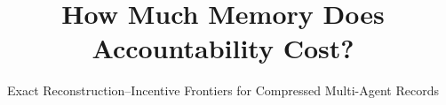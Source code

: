 \documentclass[sigconf, nonacm]{acmart}
\begin{document}
\title{How Much Memory Does Accountability Cost?}
\subtitle{Exact Reconstruction--Incentive Frontiers for Compressed Multi-Agent Records}


\begin{abstract}

\end{abstract}


\maketitle

















\appendix

\end{document}
